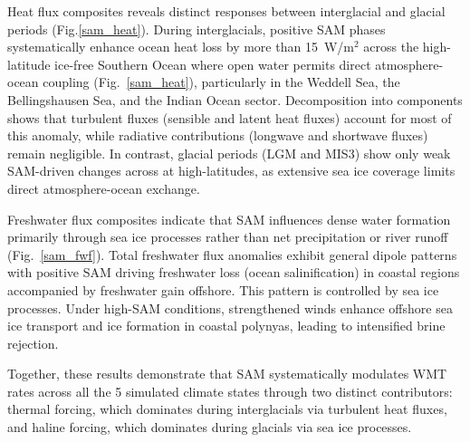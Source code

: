 \documentclass[draft]{agujournal2025}
\begin{document}
Heat flux composites reveals  distinct responses between interglacial and glacial periods (Fig.\ref{sam_heat}). During interglacials, positive SAM phases systematically enhance ocean heat loss by more than 15~W/m$^2$ across the high-latitude ice-free  Southern Ocean where open water permits direct atmosphere-ocean coupling  (Fig.~\ref{sam_heat}), particularly in the Weddell Sea, the Bellingshausen Sea, and the Indian Ocean sector. Decomposition into components shows that turbulent fluxes (sensible and latent heat fluxes) account for most of this anomaly, while radiative contributions (longwave and shortwave fluxes) remain negligible.  In contrast, glacial periods (LGM and MIS3) show only weak SAM-driven changes across at high-latitudes, as extensive sea ice coverage limits direct atmosphere-ocean exchange.


Freshwater flux composites indicate that SAM influences dense water formation primarily through sea ice processes rather than net precipitation or river runoff (Fig.~\ref{sam_fwf}). Total freshwater flux anomalies exhibit general dipole patterns with positive SAM driving freshwater loss (ocean salinification) in coastal regions accompanied by freshwater gain offshore. This pattern is controlled by sea ice processes. Under high-SAM conditions, strengthened winds enhance offshore sea ice transport and ice formation in coastal polynyas, leading to intensified brine rejection.

Together, these results demonstrate that SAM systematically modulates WMT rates across all the 5 simulated climate states through two distinct contributors: thermal forcing, which dominates during interglacials via turbulent heat fluxes, and haline forcing, which dominates during glacials via sea ice processes.




\end{document}
